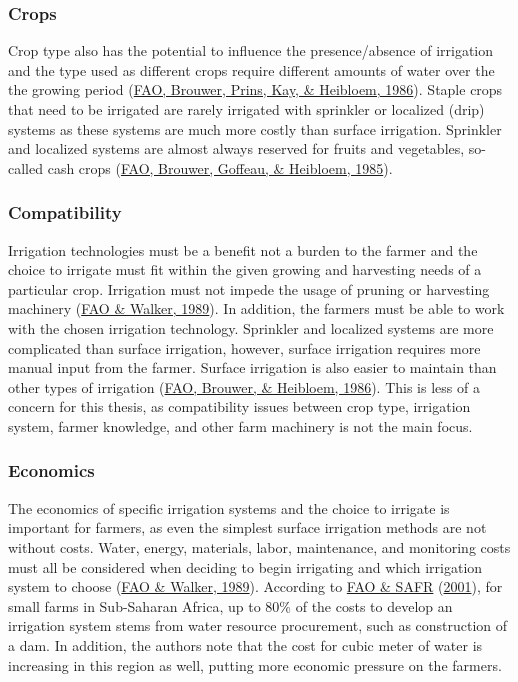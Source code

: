 \documentclass[12pt,twoside]{reedthesis}
\begin{document}
\hypertarget{crops}{%
\subsubsection{Crops}\label{crops}}

Crop type also has the potential to influence the presence/absence of irrigation and the type used as different crops require different amounts of water over the the growing period (\protect\hyperlink{ref-faoIrrigationWaterManagement1986}{FAO, Brouwer, Prins, Kay, \& Heibloem, 1986}). Staple crops that need to be irrigated are rarely irrigated with sprinkler or localized (drip) systems as these systems are much more costly than surface irrigation. Sprinkler and localized systems are almost always reserved for fruits and vegetables, so-called cash crops (\protect\hyperlink{ref-faoIrrigationWaterManagement1985}{FAO, Brouwer, Goffeau, \& Heibloem, 1985}).

\hypertarget{combatibility}{%
\subsubsection{Compatibility}\label{combatibility}}

Irrigation technologies must be a benefit not a burden to the farmer and the choice to irrigate must fit within the given growing and harvesting needs of a particular crop. Irrigation must not impede the usage of pruning or harvesting machinery (\protect\hyperlink{ref-faoGuidelinesDesigningEvaluating1989}{FAO \& Walker, 1989}). In addition, the farmers must be able to work with the chosen irrigation technology. Sprinkler and localized systems are more complicated than surface irrigation, however, surface irrigation requires more manual input from the farmer. Surface irrigation is also easier to maintain than other types of irrigation (\protect\hyperlink{ref-faoIrrigationWaterManagement1986a}{FAO, Brouwer, \& Heibloem, 1986}). This is less of a concern for this thesis, as compatibility issues between crop type, irrigation system, farmer knowledge, and other farm machinery is not the main focus.

\hypertarget{econ}{%
\subsubsection{Economics}\label{econ}}

The economics of specific irrigation systems and the choice to irrigate is important for farmers, as even the simplest surface irrigation methods are not without costs. Water, energy, materials, labor, maintenance, and monitoring costs must all be considered when deciding to begin irrigating and which irrigation system to choose (\protect\hyperlink{ref-faoGuidelinesDesigningEvaluating1989}{FAO \& Walker, 1989}). According to \protect\hyperlink{ref-faoIrrigationManualPlanning2001}{FAO \& SAFR} (\protect\hyperlink{ref-faoIrrigationManualPlanning2001}{2001}), for small farms in Sub-Saharan Africa, up to 80\% of the costs to develop an irrigation system stems from water resource procurement, such as construction of a dam. In addition, the authors note that the cost for cubic meter of water is increasing in this region as well, putting more economic pressure on the farmers.
\end{document}
